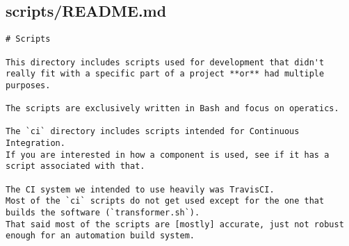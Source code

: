 \subsection{scripts/README.md}
\begin{lstlisting}[caption={Context for the scripts directory.}]
# Scripts

This directory includes scripts used for development that didn't really fit with a specific part of a project **or** had multiple purposes.

The scripts are exclusively written in Bash and focus on operatics.

The `ci` directory includes scripts intended for Continuous Integration.
If you are interested in how a component is used, see if it has a script associated with that.

The CI system we intended to use heavily was TravisCI.
Most of the `ci` scripts do not get used except for the one that builds the software (`transformer.sh`).
That said most of the scripts are [mostly] accurate, just not robust enough for an automation build system.
\end{lstlisting}
